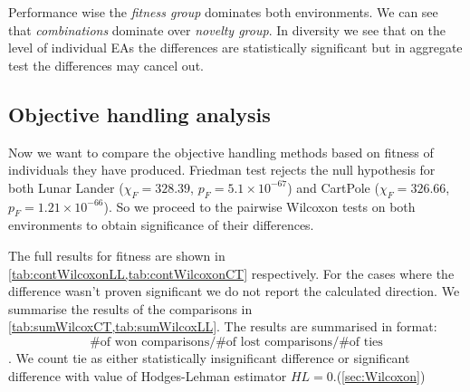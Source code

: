 \begin{table}[ht]
	\centering
	\scriptsize
	\setlength{\tabcolsep}{4pt}
	\renewcommand{\arraystretch}{1.15}
	\resizebox{\textwidth}{!}{%
		
	}
	\caption{Fitness based Wilcoxon tests of between objective groups on CartPole environment. $HL_x$ denotes calculated direction of the difference (A-B) for algorithm $x$, $p_x$ is p value of the test for algorithm $x$. $Total$ denotes collection of comparisons from both ES and DE}
	\label{tab:groupWilcoxCT}
	\vspace{0.5cm}
	\resizebox{\textwidth}{!}{%
		
	}
	\caption{Diversity based Wilcoxon tests of between objective groups on CartPole environment. $HL_x$ denotes calculated direction of the difference (A-B) for algorithm $x$, $p_x$ is p value of the test for algorithm $x$. $Total$ denotes collection of comparisons from both ES and DE}
	\label{tab:groupWilcoxCTDiv}
	
\end{table}

Performance wise the \textit{fitness group} dominates both environments. We can see that \textit{combinations} dominate over \textit{novelty group}. 
In diversity we see that on the level of individual EAs the differences are statistically significant but in aggregate test the differences may cancel out.    

\subsection{Objective handling analysis}

Now we want to compare the objective handling methods based on fitness of individuals they have produced.
Friedman test rejects the null hypothesis for both Lunar Lander ($ \chi_F = 328.39 $, $ p_F = 5.1 \times 10^{-67} $) and CartPole ($ \chi_F = 326.66 $, $ p_F = 1.21 \times 10^{-66} $). So we proceed to the pairwise Wilcoxon tests on both environments to obtain significance of their differences. 

The full results for fitness are shown in \cref{tab:contWilcoxonLL,tab:contWilcoxonCT} respectively. For the cases where the difference wasn't proven significant we do not report the calculated direction.
We summarise the results of the comparisons in \cref{tab:sumWilcoxCT,tab:sumWilcoxLL}. The results are summarised in format: $$\# \text{of won comparisons}/ \# \text{of lost comparisons}/ \# \text{of ties}$$. We count tie as either statistically insignificant difference or significant difference with value of Hodges-Lehman estimator $HL=0$.(\cref{sec:Wilcoxon}) 

